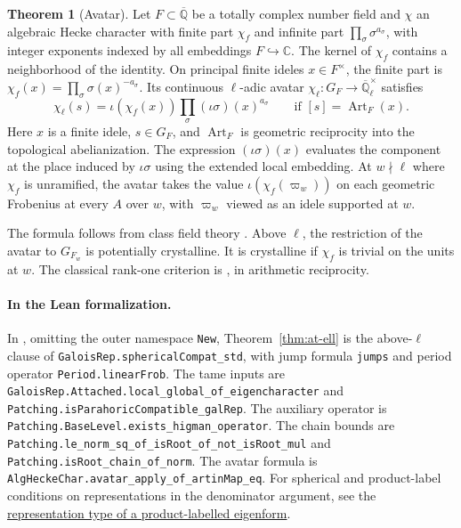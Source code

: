 \documentclass[reqno]{amsart}
\theoremstyle{definition}
\newtheorem{theorem}{Theorem}[section]
\newcommand{\Q}{\mathbb Q}
\newcommand{\C}{\mathbb C}
\newcommand{\Qlbar}{\overline{\Q}_\ell}
\newcommand{\rec}{\operatorname{Art}}
\newcommand{\leansrc}[3]{\href{https://github.com/lsernau/grh-lean/blob/72fead1/grh/src/#1\#L#2}{#3}}
\begin{document}
\begin{theorem}[Avatar]\label{thm:avatar}
Let \(F\subset\overline{\Q}\) be a totally complex number field and \(\chi\) an algebraic Hecke character with finite part \(\chi_f\) and infinite part \(\prod_\sigma\sigma^{a_\sigma}\), with integer exponents indexed by all embeddings \(F\hookrightarrow\C\).  The kernel of \(\chi_f\) contains a neighborhood of the identity.  On principal finite ideles \(x\in F^\times\), the finite part is \(\chi_f(x)=\prod_\sigma\sigma(x)^{-a_\sigma}\).  Its continuous \(\ell\)-adic avatar \(\chi_\ell:G_F\to\Qlbar^\times\) satisfies
\[
 \chi_\ell(s)=\iota(\chi_f(x))\prod_\sigma(\iota\sigma)(x)^{a_\sigma}
 \qquad\text{if }[s]=\rec_F(x).
\]
Here \(x\) is a finite idele, \(s\in G_F\), and \(\rec_F\) is geometric reciprocity into the topological abelianization.  The expression \((\iota\sigma)(x)\) evaluates the component at the place induced by \(\iota\sigma\) using the extended local embedding.  At \(w\nmid\ell\) where \(\chi_f\) is unramified, the avatar takes the value \(\iota(\chi_f(\varpi_w))\) on each geometric Frobenius at every \(A\) over \(w\), with \(\varpi_w\) viewed as an idele supported at \(w\).
\end{theorem}
The formula follows from class field theory \cite{Ser}.  Above \(\ell\), the restriction of the avatar to \(G_{F_w}\) is potentially crystalline.  It is crystalline if \(\chi_f\) is trivial on the units at \(w\).  The classical rank-one criterion is \cite[Proposition~B.4]{Con}, in arithmetic reciprocity.

\paragraph{In the Lean formalization.}
In \cite{GL}, omitting the outer namespace \nolinkurl{New}, Theorem~\ref{thm:at-ell} is the above-\(\ell\) clause of \nolinkurl{GaloisRep.sphericalCompat_std}, with jump formula \nolinkurl{jumps} and period operator \nolinkurl{Period.linearFrob}.
The tame inputs are \nolinkurl{GaloisRep.Attached.local_global_of_eigencharacter} and
\nolinkurl{Patching.isParahoricCompatible_galRep}.  The auxiliary operator is
\nolinkurl{Patching.BaseLevel.exists_higman_operator}.  The chain bounds are
\nolinkurl{Patching.le_norm_sq_of_isRoot_of_not_isRoot_mul} and
\nolinkurl{Patching.isRoot_chain_of_norm}.  The avatar formula is
\nolinkurl{AlgHeckeChar.avatar_apply_of_artinMap_eq}.
For spherical and product-label conditions on representations in the
denominator argument, see the
\leansrc{New/Congruences/GaloisRepresentations/AttachedRepresentations.lean}{641}{representation type of a product-labelled eigenform}.
\end{document}
